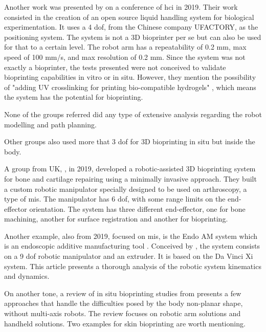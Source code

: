 Another work was presented by \citeauthor{Gome2019_openlh}\cite{Gome2019_openlh} on a conference of \gls{hci} in 2019. Their work consisted in the creation of an open source liquid handling system for biological experimentation. It uses a 4 \gls{dof}, from the Chinese company UFACTORY, as the positioning system. The system is not a 3D bioprinter per se but can also be used for that to a certain level. The robot arm has a repeatability of 0.2 mm, max speed of 100 mm/s, and max resolution of 0.2 mm. Since the system was not exactly a bioprinter, the tests presented were not conceived to validate bioprinting capabilities in vitro or in situ. However, they mention the possibility of "adding UV crosslinking for printing bio-compatible hydrogels" \cite{Gome2019_openlh}, which means the system has the potential for bioprinting.

None of the groups referred did any type of extensive analysis regarding the robot modelling and path planning. \bigskip

Other groups also used more that 3 \gls{dof} for 3D bioprinting in situ but inside the body.

A group from UK, \citeauthor{Lipskas2019_robotic_assisted_3dbioprint_repairing_bone_cartilage}\cite{Lipskas2019_robotic_assisted_3dbioprint_repairing_bone_cartilage}, in 2019, developed a robotic-assisted 3D bioprinting system for bone and cartilage repairing using a minimally invasive approach. They built a custom robotic manipulator specially designed to be used on arthroscopy, a type of \gls{mis}. The manipulator has 6 \gls{dof}, with some range limits on the end-effector orientation. The system has three different end-effector, one for bone machining, another for surface registration and another for bioprinting.

Another example, also from 2019, focused on \gls{mis}, is the Endo AM system which is an endoscopic additive manufacturing tool \cite{Simeunovic2019_endoscopic_additive_manufacturing}. Conceived by \citeauthor{Simeunovic2019_endoscopic_additive_manufacturing}, the system consists on a 9 \gls{dof} robotic manipulator and an extruder. It is based on the Da Vinci Xi system. This article presents a thorough analysis of the robotic system kinematics and dynamics.\bigskip

On another tone, a review of in situ bioprinting studies from \citeauthor{Singh2020a_in_situ_bioprinting}\cite{Singh2020a_in_situ_bioprinting} presents a few approaches that handle the difficulties posed by the body non-planar shape, without multi-axis robots. The review focuses on robotic arm solutions and handheld solutions. Two examples for skin bioprinting are worth mentioning.

